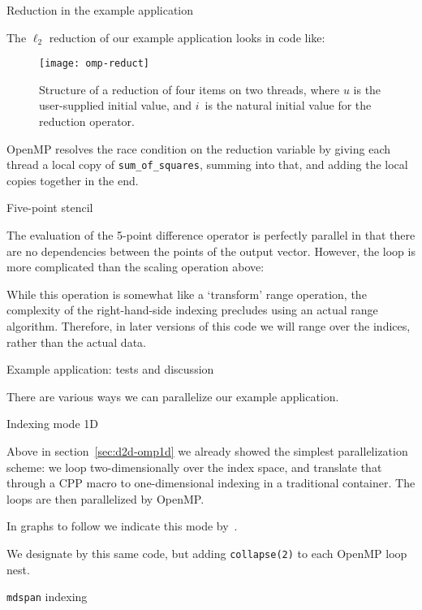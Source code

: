  {Reduction in the example application}

The $\ell_2$ reduction of our example application
looks in code like:
%

\begin{figure}[t]
  \texttt{[image: omp-reduct]}
  \caption{Structure of a reduction of four items on two threads,
    where $u$ is the user-supplied initial value,
    and $i$~is the natural initial value for the reduction operator.}
  \label{fig:omp-reduct}
\end{figure}

OpenMP resolves the race condition on the reduction variable
by giving each thread a local copy of \lstinline{sum_of_squares},
summing into that, and adding the local copies together in the end.


 {Five-point stencil}
\label{sec:d2d-5pt}

The evaluation of the 5-point difference operator is perfectly parallel
in that there are no dependencies between the points of the output vector.
However, the loop is more complicated than the scaling operation above:
%

While this operation is somewhat like a `transform' range operation,
the complexity of the right-hand-side indexing precludes using
an actual range algorithm.
Therefore, in later versions of this code we will range over
the indices, rather than the actual data.


 {Example application: tests and discussion}

There are various ways we can parallelize our example application.

 {Indexing mode 1D}

Above in section~\ref{sec:d2d-omp1d}
we already showed the simplest parallelization scheme:
we loop two-dimensionally over the index space,
and translate that through a \ac{CPP} macro
to one-dimensional indexing in a traditional container.
The loops are then parallelized by OpenMP.

In graphs to follow we indicate this mode by~.

We designate by  this same code, but adding
\lstinline{collapse(2)} to each OpenMP loop nest.

 {\texttt{mdspan} indexing}

